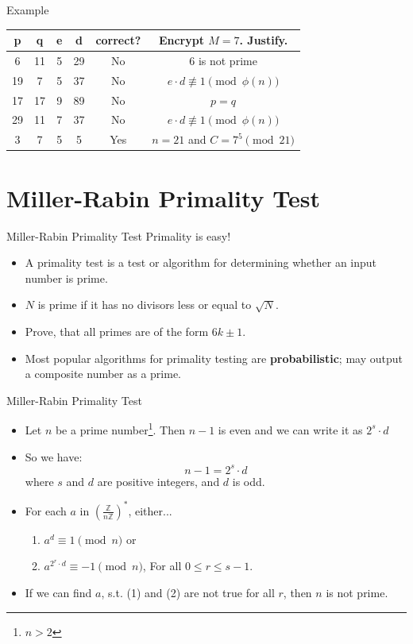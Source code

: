 \documentclass{beamer}
\begin{document}
\begin{frame}{Example}
    \centering
    \begin{tabular}{|c|c|c|c|c|c|}
        \hline
         p  & q  & e  & d  & correct? & Encrypt $M = 7$. Justify.  \\ \hline
         6  & 11 & 5  & 29 & No       & 6 is not prime  \\ \hline
         19 & 7  & 5  & 37 & No       & $e \cdot d \not\equiv 1 \pmod{\phi(n)} $  \\ \hline
         17 & 17 & 9  & 89 & No       & $p = q$  \\ \hline
         29 & 11 & 7  & 37 & No       & $e \cdot d \not\equiv 1 \pmod{\phi(n)} $  \\ \hline
         3  & 7  & 5  & 5  & Yes      & $n = 21$ and $C = 7^5 \pmod{21}$  \\ \hline
    \end{tabular}
\end{frame}

\section{Miller-Rabin Primality Test}

\begin{frame}{Miller-Rabin Primality Test}
    Primality is easy!
    \begin{itemize}
        \item A primality test is a test or algorithm for determining whether an input number is prime.
        \item $N$ is prime if it has no divisors less or equal to $\sqrt{N}$.
        \item Prove, that all primes are of the form $6k \pm 1$.
        \item Most popular algorithms for primality testing are \textbf{probabilistic}; may output a composite number as a prime.
    \end{itemize}
\end{frame}

\begin{frame}{Miller-Rabin Primality Test}
    \begin{itemize}
        \item Let $n$ be a prime number\footnote{$n > 2$}. Then $n - 1$ is even and we can write it as $2^{s} \cdot d$
        \item So we have: $$n - 1 = 2^{s} \cdot d$$where $s$ and $d$ are positive integers, and $d$ is odd. 
        \item For each $a$ in $(\frac{\mathbb{Z}}{n\mathbb{Z}})^{*}$, either...
        \begin{enumerate}
            \item $a^{d} \equiv 1 \pmod n$ or    
            \item $a^{2^r \cdot d} \equiv -1 \pmod n$, {\scriptsize For all $0 \leq r \leq s - 1$.}
        \end{enumerate}
        \item If we can find $a$, s.t. (1) and (2) are not true for all $r$, then $n$ is not prime.
    \end{itemize}
\end{frame}
\end{document}
